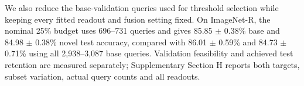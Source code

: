 We also reduce the base-validation queries used for threshold selection while keeping every fitted readout and fusion setting fixed. On ImageNet-R, the nominal 25\% budget uses 696--731 queries and gives 85.85 $\pm$ 0.38\% base and 84.98 $\pm$ 0.38\% novel test accuracy, compared with 86.01 $\pm$ 0.59\% and 84.73 $\pm$ 0.71\% using all 2,938--3,087 base queries. Validation feasibility and achieved test retention are measured separately; Supplementary Section H reports both targets, subset variation, actual query counts and all readouts.
